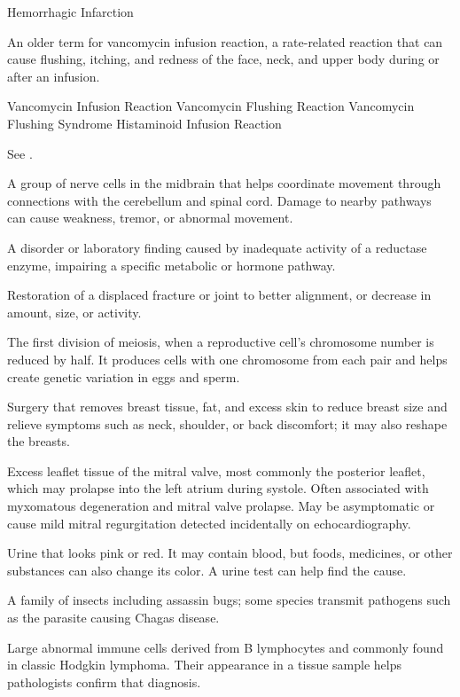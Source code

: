 \synonyms
Hemorrhagic Infarction

 An older term for vancomycin infusion reaction, a rate-related reaction that can cause flushing, itching, and redness of the face, neck, and upper body during or after an infusion.

\synonyms
Vancomycin Infusion Reaction
Vancomycin Flushing Reaction
Vancomycin Flushing Syndrome
Histaminoid Infusion Reaction

 See .

 A group of nerve cells in the midbrain that helps coordinate movement through connections with the cerebellum and spinal cord. Damage to nearby pathways can cause weakness, tremor, or abnormal movement.

 A disorder or laboratory finding caused by inadequate activity of a reductase enzyme, impairing a specific metabolic or hormone pathway.

 Restoration of a displaced fracture or joint to better alignment, or decrease in amount, size, or activity.

 The first division of meiosis, when a reproductive cell's chromosome number is reduced by half. It produces cells with one chromosome from each pair and helps create genetic variation in eggs and sperm.

 Surgery that removes breast tissue, fat, and excess skin to reduce breast size and relieve symptoms such as neck, shoulder, or back discomfort; it may also reshape the breasts.

 Excess leaflet tissue of the mitral valve, most commonly the posterior leaflet, which
may prolapse into the left atrium during systole. Often associated with myxomatous
degeneration and mitral valve prolapse. May be asymptomatic or cause mild mitral
regurgitation detected incidentally on echocardiography.

 Urine that looks pink or red. It may contain blood, but foods, medicines, or other substances can also change its color. A urine test can help find the cause.

 A family of insects including assassin bugs; some species transmit pathogens such as the parasite causing Chagas disease.

 Large abnormal immune cells derived from B lymphocytes and commonly found in classic Hodgkin lymphoma. Their appearance in a tissue sample helps pathologists confirm that diagnosis.

